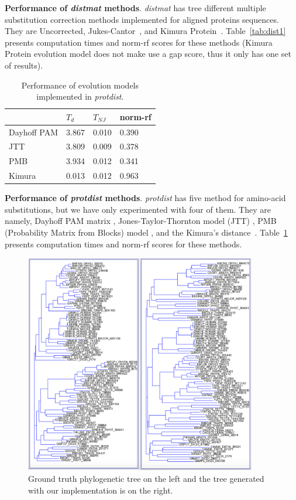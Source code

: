 \documentclass[11pt,letterpaper]{article}
\theoremstyle{definition}
\begin{document}
\textbf{Performance of \textit{distmat} methods}. \textit{distmat} has tree different multiple substitution correction methods implemented for aligned proteins sequences. They are Uncorrected, Jukes-Cantor~\cite{jukes1969evolution}, and Kimura Protein~\cite{kimura1980simple}. Table~\ref{tab:dist1} presents computation times and norm-rf scores for these methods (Kimura Protein evolution model does not make use a gap score, thus it only has one set of results).

\begin{table}[h]
\centering
	\begin{tabular}{l|lll}
	\hline
	&	$T_d$	& $T_{NJ}$	& norm-rf  \\
	\hline
	Dayhoff PAM	&	3.867	&	0.010	&	0.390	\\
	JTT			&	3.809	&	0.009	&	0.378	\\
	PMB			&	3.934	&	0.012	&	0.341	\\
	Kimura		&	0.013	&	0.012	&	0.963	\\
	\hline
	\end{tabular}
\caption{Performance of evolution models implemented in \textit{protdist}.}\label{tab:dist2}
\end{table}

\textbf{Performance of \textit{protdist} methods}. \textit{protdist} has five method for amino-acid substitutions, but we have only experimented with four of them. They are namely, Dayhoff PAM matrix \cite{kosiol2005different}, Jones-Taylor-Thornton model (JTT) \cite{jones1992rapid}, PMB (Probability Matrix from Blocks) model \cite{veerassamy2003transition}, and the Kimura's distance~\cite{kimura1983rare}. Table~\ref{tab:dist2} presents computation times and norm-rf scores for these methods.

\begin{figure}[t]
  \centering
  \includegraphics[width=0.9\textwidth]{gt-PMB.jpg}
  \caption{Ground truth phylogenetic tree on the left and the tree generated with our implementation is on the right.}
  \label{fig:gt-PMB}
\end{figure}
\end{document}
